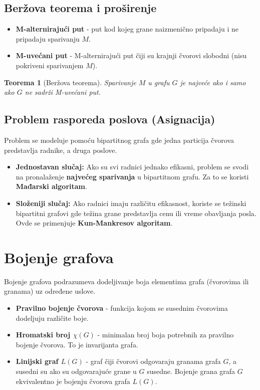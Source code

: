 \documentclass[a4paper,12pt,twoside]{report}
\newtheorem{theorem}{Teorema}[section]
\numberwithin{algorithm}{section}
\begin{document}
\subsection*{Beržova teorema i proširenje}
\begin{itemize}
    \item \textbf{M-alternirajući put} - put kod kojeg grane naizmenično pripadaju i ne pripadaju sparivanju $M$.
    \item \textbf{M-uvećani put} - M-alternirajući put čiji su krajnji čvorovi slobodni (nisu pokriveni sparivanjem $M$).
\end{itemize}

\begin{theorem}[Beržova teorema]
    Sparivanje $M$ u grafu $G$ je najveće ako i samo ako $G$ ne sadrži M-uvećani put.
\end{theorem}

\subsection*{Problem rasporeda poslova (Asignacija)}
Problem se modeluje pomoću bipartitnog grafa gde jedna particija čvorova predstavlja radnike, a druga poslove.

\begin{itemize}
    \item \textbf{Jednostavan slučaj:} Ako su svi radnici jednako efikasni, problem se svodi na pronalaženje \textbf{najvećeg sparivanja} u bipartitnom grafu. Za to se koristi \textbf{Mađarski algoritam}.
    \item \textbf{Složeniji slučaj:} Ako radnici imaju različitu efikasnost, koriste se težinski bipartitni grafovi gde težina grane predstavlja cenu ili vreme obavljanja posla. Ovde se primenjuje \textbf{Kun-Mankresov algoritam}.
\end{itemize}

\section{Bojenje grafova}
Bojenje grafova podrazumeva dodeljivanje boja elementima grafa (čvorovima ili granama) uz određene uslove.

\begin{itemize}
    \item \textbf{Pravilno bojenje čvorova} - funkcija kojom se susednim čvorovima dodeljuju različite boje.
    \item \textbf{Hromatski broj $\chi(G)$} - minimalan broj boja potrebnih za pravilno bojenje čvorova. To je invarijanta grafa.
    \item \textbf{Linijski graf $L(G)$} - graf čiji čvorovi odgovaraju granama grafa $G$, a susedni su ako su odgovarajuće grane u $G$ susedne. Bojenje grana grafa $G$ ekvivalentno je bojenju čvorova grafa $L(G)$.
\end{itemize}
\end{document}
